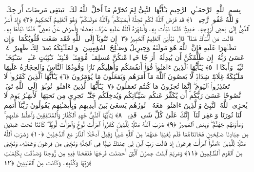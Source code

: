 
  
    
  
    
    

\nopagebreak
  بِسمِ ٱللَّهِ ٱلرَّحمَـٰنِ ٱلرَّحِيمِ
  يَـٰٓأَيُّهَا ٱلنَّبِىُّ لِمَ تُحَرِّمُ مَآ أَحَلَّ ٱللَّهُ لَكَ ۖ تَبتَغِى مَرضَاتَ أَزوَٟجِكَ ۚ وَٱللَّهُ غَفُورٌۭ رَّحِيمٌۭ ﴿١﴾
 قَد فَرَضَ ٱللَّهُ لَكُم تَحِلَّةَ أَيمَـٰنِكُم ۚ وَٱللَّهُ مَولَىٰكُم ۖ وَهُوَ ٱلعَلِيمُ ٱلحَكِيمُ ﴿٢﴾
 وَإِذ أَسَرَّ ٱلنَّبِىُّ إِلَىٰ بَعضِ أَزوَٟجِهِۦ حَدِيثًۭا فَلَمَّا نَبَّأَت بِهِۦ وَأَظهَرَهُ ٱللَّهُ عَلَيهِ عَرَّفَ بَعضَهُۥ وَأَعرَضَ عَنۢ بَعضٍۢ ۖ فَلَمَّا نَبَّأَهَا بِهِۦ قَالَت مَن أَنۢبَأَكَ هَـٰذَا ۖ قَالَ نَبَّأَنِىَ ٱلعَلِيمُ ٱلخَبِيرُ ﴿٣﴾
 إِن تَتُوبَآ إِلَى ٱللَّهِ فَقَد صَغَت قُلُوبُكُمَا ۖ وَإِن تَظَـٰهَرَا عَلَيهِ فَإِنَّ ٱللَّهَ هُوَ مَولَىٰهُ وَجِبرِيلُ وَصَـٰلِحُ ٱلمُؤمِنِينَ ۖ وَٱلمَلَـٰٓئِكَةُ بَعدَ ذَٟلِكَ ظَهِيرٌ ﴿٤﴾
 عَسَىٰ رَبُّهُۥٓ إِن طَلَّقَكُنَّ أَن يُبدِلَهُۥٓ أَزوَٟجًا خَيرًۭا مِّنكُنَّ مُسلِمَـٰتٍۢ مُّؤمِنَـٰتٍۢ قَـٰنِتَـٰتٍۢ تَـٰٓئِبَٰتٍ عَـٰبِدَٟتٍۢ سَـٰٓئِحَـٰتٍۢ ثَيِّبَٰتٍۢ وَأَبكَارًۭا ﴿٥﴾
 يَـٰٓأَيُّهَا ٱلَّذِينَ ءَامَنُوا۟ قُوٓا۟ أَنفُسَكُم وَأَهلِيكُم نَارًۭا وَقُودُهَا ٱلنَّاسُ وَٱلحِجَارَةُ عَلَيهَا مَلَـٰٓئِكَةٌ غِلَاظٌۭ شِدَادٌۭ لَّا يَعصُونَ ٱللَّهَ مَآ أَمَرَهُم وَيَفعَلُونَ مَا يُؤمَرُونَ ﴿٦﴾
 يَـٰٓأَيُّهَا ٱلَّذِينَ كَفَرُوا۟ لَا تَعتَذِرُوا۟ ٱليَومَ ۖ إِنَّمَا تُجزَونَ مَا كُنتُم تَعمَلُونَ ﴿٧﴾
 يَـٰٓأَيُّهَا ٱلَّذِينَ ءَامَنُوا۟ تُوبُوٓا۟ إِلَى ٱللَّهِ تَوبَةًۭ نَّصُوحًا عَسَىٰ رَبُّكُم أَن يُكَفِّرَ عَنكُم سَيِّـَٔاتِكُم وَيُدخِلَكُم جَنَّـٰتٍۢ تَجرِى مِن تَحتِهَا ٱلأَنهَـٰرُ يَومَ لَا يُخزِى ٱللَّهُ ٱلنَّبِىَّ وَٱلَّذِينَ ءَامَنُوا۟ مَعَهُۥ ۖ نُورُهُم يَسعَىٰ بَينَ أَيدِيهِم وَبِأَيمَـٰنِهِم يَقُولُونَ رَبَّنَآ أَتمِم لَنَا نُورَنَا وَٱغفِر لَنَآ ۖ إِنَّكَ عَلَىٰ كُلِّ شَىءٍۢ قَدِيرٌۭ ﴿٨﴾
 يَـٰٓأَيُّهَا ٱلنَّبِىُّ جَٰهِدِ ٱلكُفَّارَ وَٱلمُنَـٰفِقِينَ وَٱغلُظ عَلَيهِم ۚ وَمَأوَىٰهُم جَهَنَّمُ ۖ وَبِئسَ ٱلمَصِيرُ ﴿٩﴾
 ضَرَبَ ٱللَّهُ مَثَلًۭا لِّلَّذِينَ كَفَرُوا۟ ٱمرَأَتَ نُوحٍۢ وَٱمرَأَتَ لُوطٍۢ ۖ كَانَتَا تَحتَ عَبدَينِ مِن عِبَادِنَا صَـٰلِحَينِ فَخَانَتَاهُمَا فَلَم يُغنِيَا عَنهُمَا مِنَ ٱللَّهِ شَيـًۭٔا وَقِيلَ ٱدخُلَا ٱلنَّارَ مَعَ ٱلدَّٰخِلِينَ ﴿١٠﴾
 وَضَرَبَ ٱللَّهُ مَثَلًۭا لِّلَّذِينَ ءَامَنُوا۟ ٱمرَأَتَ فِرعَونَ إِذ قَالَت رَبِّ ٱبنِ لِى عِندَكَ بَيتًۭا فِى ٱلجَنَّةِ وَنَجِّنِى مِن فِرعَونَ وَعَمَلِهِۦ وَنَجِّنِى مِنَ ٱلقَومِ ٱلظَّـٰلِمِينَ ﴿١١﴾
 وَمَريَمَ ٱبنَتَ عِمرَٰنَ ٱلَّتِىٓ أَحصَنَت فَرجَهَا فَنَفَخنَا فِيهِ مِن رُّوحِنَا وَصَدَّقَت بِكَلِمَـٰتِ رَبِّهَا وَكُتُبِهِۦ وَكَانَت مِنَ ٱلقَـٰنِتِينَ ﴿١٢﴾
 
